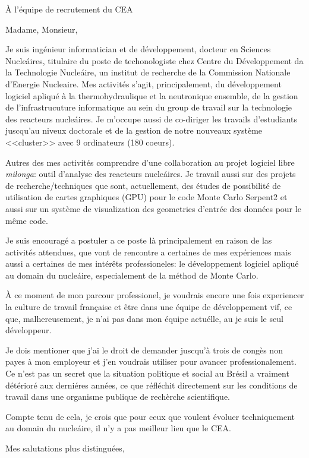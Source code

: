 \documentclass[11pt]{letter}
\begin{document}
\begin{letter}{À l'équipe de recrutement du CEA}

  \opening{Madame, Monsieur,}

  Je suis ingénieur informatician et de développement, docteur en Sciences Nucleáires, titulaire du poste de techonologiste chez Centre du Développement da la Technologie Nucleáire, un institut de recherche de la Commission Nationale d'Energie Nucleaire. Mes activités s'agit, principalement, du développement logiciel apliqué à la thermohydraulique et la neutronique
  ensemble, de la gestion de l'infrastrucuture informatique au sein du group de travail sur la technologie des reacteurs
  nucleáires. Je m'occupe aussi de co-diriger les travails d'estudiants juscqu'au niveux
  doctorale et de la gestion de notre nouveaux système <<cluster>> avec 9 ordinateurs (180 coeurs).

  Autres des mes activités comprendre d'une collaboration au projet logiciel libre \textit{milonga}: outil d'analyse
  des reacteurs nucleáires. Je travail aussi sur des projets de recherche/techniques que sont, actuellement, des
  études de possibilité de utilisation de cartes graphiques (GPU) pour le code Monte Carlo Serpent2 et aussi sur un système
  de visualization des geometries d'entrée des données pour le même code.

  Je suis encouragé a postuler a ce poste là principalement en raison de las activités attendues, que vont de
  rencontre a certaines de mes expériences mais aussi a certaines de mes intérêts professioneles: le développement
  logiciel apliqué au domain du nucleáire, especialement de la méthod de Monte Carlo.

  À ce moment de mon parcour professionel, je voudrais encore une fois experiencer la culture de travail française
  et être dans une équipe de développement vif, ce que, malhereusement, je n'ai pas dans mon équipe actuélle, au je
  suis le seul développeur.

  Je dois mentioner que j'ai le droit de demander juscqu'à trois de congès non payes à mon employeur et j'en voudrais
  utiliser pour avancer professionalement. Ce n'est pas un secret que la situation politique et social au Brésil a
  vraiment détérioré aux derniéres années, ce que réfléchit directement sur les conditions de travail dans une organisme
  publique de rechèrche scientifique.


  Compte tenu de cela, je crois que pour ceux que voulent évoluer techniquement au domain du nucleáire, il n'y
  a pas meilleur lieu que le CEA.
  
  
  \closing{Mes salutations plus distinguées,}

  
\end{letter}
\end{document}
